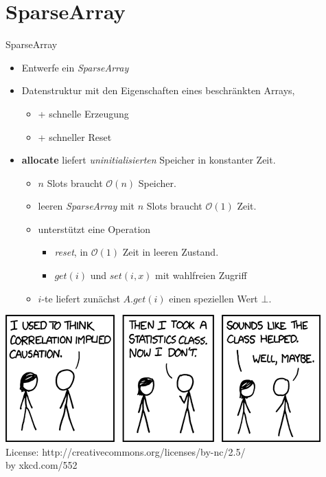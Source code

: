 \documentclass[18pt]{beamer}
\newcommand{\Oh}{\mathcal{O}}
\begin{document}
\section{SparseArray}
\begin{frame}{SparseArray}
\begin{itemize}
 \item 	Entwerfe ein \textit{SparseArray} 
 \item 	Datenstruktur mit den Eigenschaften eines beschränkten Arrays, 
  \begin{itemize}
   \item + schnelle Erzeugung
   \item + schneller Reset
  \end{itemize}
 \item \textbf{allocate} liefert \emph{uninitialisierten} Speicher in konstanter Zeit.
	\begin{itemize}
	\item $n$ Slots braucht $\Oh(n)$ Speicher.
	\item leeren \textit{SparseArray} mit $n$ Slots braucht $\Oh(1)$ Zeit. 
	\item unterstützt eine Operation
	\begin{itemize}
	 \item \textit{reset}, in $\Oh(1)$ Zeit in leeren Zustand.
	 \item $\mathit{get}(i)$ und $\mathit{set}(i,x)$ mit wahlfreien Zugriff
	\end{itemize}
	\item $i$-te liefert zunächst $A.\mathit{get}(i)$ einen speziellen Wert $\bot$.
	\end{itemize}
\end{itemize}
 
\end{frame}




\begin{frame}
\includegraphics[scale=0.7]{correlation} \\
License: http://creativecommons.org/licenses/by-nc/2.5/ \\
by xkcd.com/552
\end{frame}
\end{document}
